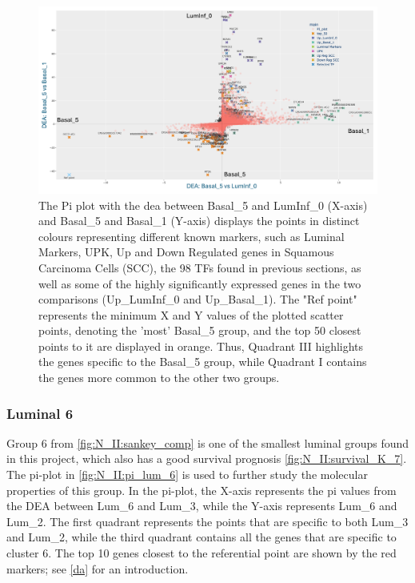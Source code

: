 \begin{figure}[!htb]    
    \centering
    \includegraphics[width=1.0\textwidth,height=1.0\textheight,keepaspectratio]{Sections/Network_II/resources/reward/PI_Basal_5.png}
    \caption{The Pi plot with the \acrfull{dea} between Basal\_5 and LumInf\_0 (X-axis) and Basal\_5 and Basal\_1 (Y-axis) displays the points in distinct colours representing different known markers, such as Luminal Markers, UPK, Up and Down Regulated genes in Squamous Carcinoma Cells (SCC), the 98 TFs found in previous sections, as well as some of the highly significantly expressed genes in the two comparisons (Up\_LumInf\_0 and Up\_Basal\_1). The "Ref point" represents the minimum X and Y values of the plotted scatter points, denoting the 'most' Basal\_5 group, and the top 50 closest points to it are displayed in orange. Thus, Quadrant III highlights the genes specific to the Basal\_5 group, while Quadrant I contains the genes more common to the other two groups.}
    \label{fig:N_II:pi_basal_5}
\end{figure}



\subsubsection*{Luminal 6} \label{s:N_II:lum_6}

Group 6 from \cref{fig:N_II:sankey_comp} is one of the smallest luminal groups found in this project, which also has a good survival prognosis \cref{fig:N_II:survival_K_7}. The pi-plot in \cref{fig:N_II:pi_lum_6} is used to further study the molecular properties of this group. In the pi-plot, the X-axis represents the pi values from the DEA between Lum\_6 and Lum\_3, while the Y-axis represents Lum\_6 and Lum\_2. The first quadrant represents the points that are specific to both Lum\_3 and Lum\_2, while the third quadrant contains all the genes that are specific to cluster 6. The top 10 genes closest to the referential point are shown by the red markers; see \cref{da} for an introduction.



